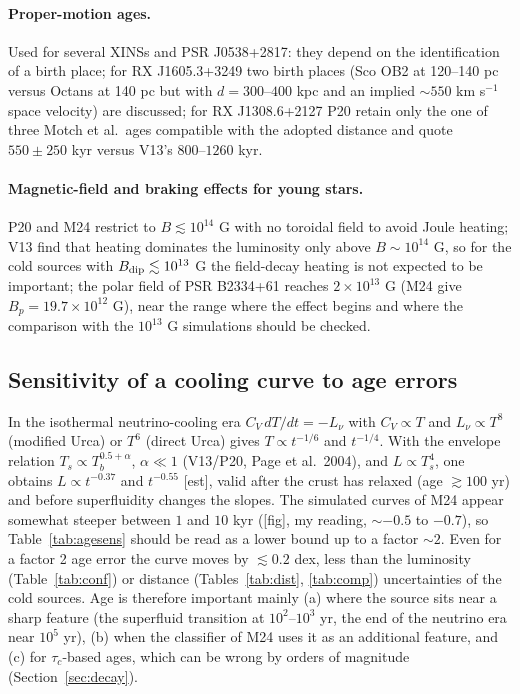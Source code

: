 \documentclass[11pt,a4paper]{article}
\newcommand{\src}[1]{\textsf{[#1]}}
\begin{document}
\paragraph{Proper-motion ages.} Used for several XINSs and PSR J0538+2817: they depend on the identification of a birth place; for RX J1605.3+3249 two birth places (Sco OB2 at 120--140 pc versus Octans at 140 pc but with $d=300$--$400$ kpc and an implied $\sim550$ km s$^{-1}$ space velocity) are discussed; for RX J1308.6+2127 P20 retain only the one of three Motch et al.\ ages compatible with the adopted distance and quote $550\pm250$ kyr versus V13's $800$--$1260$ kyr.
\paragraph{Magnetic-field and braking effects for young stars.} P20 and M24 restrict to $B\lesssim10^{14}$ G with no toroidal field to avoid Joule heating; V13 find that heating dominates the luminosity only above $B\sim10^{14}$ G, so for the cold sources with $B_{\rm dip}\lesssim10^{13}$ G the field-decay heating is not expected to be important; the polar field of PSR B2334+61 reaches $2\times10^{13}$ G (M24 give $B_p=19.7\times10^{12}$ G), near the range where the effect begins and where the comparison with the $10^{13}$ G simulations should be checked.

\subsection{Sensitivity of a cooling curve to age errors}\label{sec:ageerr}
In the isothermal neutrino-cooling era $C_V\,dT/dt=-L_\nu$ with $C_V\propto T$ and $L_\nu\propto T^8$ (modified Urca) or $T^6$ (direct Urca) gives $T\propto t^{-1/6}$ and $t^{-1/4}$. With the envelope relation $T_s\propto T_b^{0.5+\alpha}$, $\alpha\ll1$ (V13/P20, Page et al.\ 2004), and $L\propto T_s^4$, one obtains $L\propto t^{-0.37}$ and $t^{-0.55}$ \src{est}, valid after the crust has relaxed (age $\gtrsim100$ yr) and before superfluidity changes the slopes. The simulated curves of M24 appear somewhat steeper between $1$ and $10$ kyr (\src{fig}, my reading, $\sim-0.5$ to $-0.7$), so Table~\ref{tab:agesens} should be read as a lower bound up to a factor $\sim2$. Even for a factor 2 age error the curve moves by $\lesssim0.2$ dex, less than the luminosity (Table~\ref{tab:conf}) or distance (Tables~\ref{tab:dist}, \ref{tab:comp}) uncertainties of the cold sources. Age is therefore important mainly (a) where the source sits near a sharp feature (the superfluid transition at $10^2$--$10^3$ yr, the end of the neutrino era near $10^5$ yr), (b) when the classifier of M24 uses it as an additional feature, and (c) for $\tau_c$-based ages, which can be wrong by orders of magnitude (Section~\ref{sec:decay}).
\end{document}
